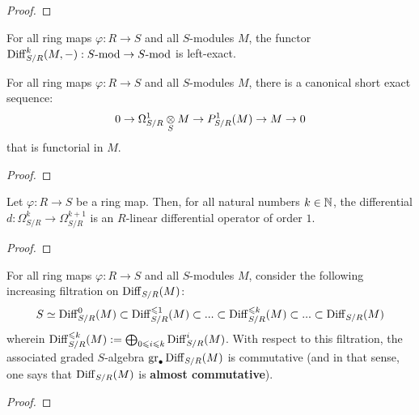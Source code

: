                 \begin{proof}
                    
                \end{proof}
            \begin{corollary}
                For all ring maps $\varphi: R \to S$ and all $S$-modules $M$, the functor $\mathrm{Diff}_{S/R}^k(M, -): S\text{-}\mathrm{mod} \to S\text{-}\mathrm{mod}$ is left-exact. 
            \end{corollary}
            \begin{lemma} \label{lemma: differential_forms_are_differential_operators}
                For all ring maps $\varphi: R \to S$ and all $S$-modules $M$, there is a canonical short exact sequence:
                    $$0 \to \Omega_{S/R}^1 \tensor_S M \to P^1_{S/R}(M) \to M \to 0$$
                that is functorial in $M$.
            \end{lemma}
                \begin{proof}
                    
                \end{proof}
            \begin{proposition} \label{prop: differential_forms_are_differential_operators}
                Let $\varphi: R \to S$ be a ring map. Then, for all natural numbers $k \in \mathbb{N}$, the differential $d: \Omega_{S/R}^k \to \Omega_{S/R}^{k + 1}$ is an $R$-linear differential operator of order $1$.
            \end{proposition}
                \begin{proof}
                    
                \end{proof}
            
            \begin{lemma} \label{lemma: rings_of_differential_operators_are_almost_commutative}
                For all ring maps $\varphi: R \to S$ and all $S$-modules $M$, consider the following increasing filtration on $\mathrm{Diff}_{S/R}(M)$:
                    $$S \simeq \mathrm{Diff}_{S/R}^0(M) \subset \mathrm{Diff}_{S/R}^{\leqslant 1}(M) \subset ... \subset \mathrm{Diff}_{S/R}^{\leqslant k}(M) \subset ... \subset \mathrm{Diff}_{S/R}(M)$$
                wherein $\mathrm{Diff}_{S/R}^{\leqslant k}(M) := \bigoplus_{0 \leqslant i \leqslant k} \mathrm{Diff}_{S/R}^i(M)$. With respect to this filtration, the associated graded $S$-algebra $\operatorname{gr}_{\bullet} \mathrm{Diff}_{S/R}(M)$ is commutative (and in that sense, one says that $\mathrm{Diff}_{S/R}(M)$ is \textbf{almost commutative}).
            \end{lemma}
                \begin{proof}
                    
                \end{proof}
            
